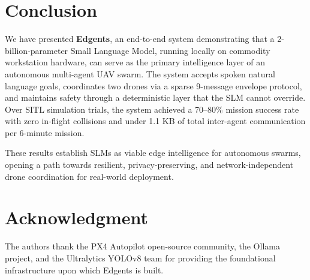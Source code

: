 \documentclass[conference]{IEEEtran}
\begin{document}
\section{Conclusion}
\label{sec:conclusion}

We have presented \textbf{Edgents}, an end-to-end system demonstrating that a 2-billion-parameter Small Language Model, running locally on commodity workstation hardware, can serve as the primary intelligence layer of an autonomous multi-agent UAV swarm. The system accepts spoken natural language goals, coordinates two drones via a sparse 9-message envelope protocol, and maintains safety through a deterministic layer that the SLM cannot override. Over SITL simulation trials, the system achieved a 70–80\% mission success rate with zero in-flight collisions and under 1.1 KB of total inter-agent communication per 6-minute mission.

These results establish SLMs as viable edge intelligence for autonomous swarms, opening a path towards resilient, privacy-preserving, and network-independent drone coordination for real-world deployment.

\section*{Acknowledgment}

The authors thank the PX4 Autopilot open-source community, the Ollama project, and the Ultralytics YOLOv8 team for providing the foundational infrastructure upon which Edgents is built.
\end{document}
